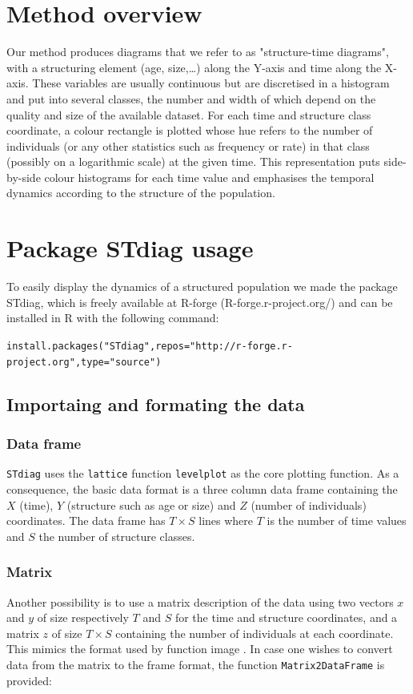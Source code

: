 \section{Method overview}

Our method produces diagrams that we refer to as "structure-time diagrams", with
a structuring element (age, size,\ldots) along the Y-axis and time along the
X-axis. These variables are usually continuous but are discretised in a
histogram and put into several classes, the number and width of which depend on
the quality and size of the available dataset. For each time and structure class
coordinate, a colour rectangle is plotted whose hue refers to the number of
individuals (or any other statistics such as frequency or rate) in that class
(possibly on a logarithmic scale) at the given time. This representation puts
side-by-side colour histograms for each time value and emphasises the temporal
dynamics according to the structure of the population.

\section{Package STdiag usage}

To easily display the dynamics of a structured population we made the package
STdiag, which is freely available at R-forge (R-forge.r-project.org/) and can be
installed in R with the following command:

\texttt{install.packages("STdiag",repos="http://r-forge.r-project.org",type="source")}

\subsection{Importaing and formating the data}

\subsubsection{Data frame}
\texttt{STdiag} uses the \texttt{lattice} function \texttt{levelplot}
\autocites{sarkar2008a} as the core plotting function. As a consequence, the
basic data format is a three column data frame containing the $X$ (time), $Y$
(structure such as age or size) and $Z$ (number of individuals) coordinates. The
data frame has $T \times S$ lines where $T$ is the number of time values and $S$
the number of structure classes.

\subsubsection{Matrix}
Another possibility is to use a matrix description of the data using two vectors
$x$ and $y$ of size respectively $T$ and $S$ for the time and structure
coordinates, and a matrix $z$ of size $T \times S$ containing the number of
individuals at each coordinate. This mimics the format used by function image
\autocites{team2012a}. In case one wishes to
convert data from the matrix to the frame format, the function
\texttt{Matrix2DataFrame} is provided:

